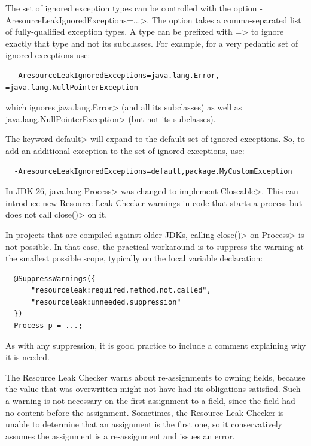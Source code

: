 The set of ignored exception types can be controlled with the option
\<-AresourceLeakIgnoredExceptions=...>.  The option takes a comma-separated list of
fully-qualified exception types.  A type can be prefixed with \<=> to ignore exactly
that type and not its subclasses.  For example, for a very pedantic set of ignored
exceptions use:

\begin{verbatim}
  -AresourceLeakIgnoredExceptions=java.lang.Error, =java.lang.NullPointerException
\end{verbatim}

which ignores \<java.lang.Error> (and all its subclasses) as well as
\<java.lang.NullPointerException> (but not its subclasses).

The keyword \<default> will expand to the default set of ignored exceptions.  So,
to add an additional exception to the set of ignored exceptions, use:

\begin{verbatim}
  -AresourceLeakIgnoredExceptions=default,package.MyCustomException
\end{verbatim}


In JDK 26, \<java.lang.Process> was changed to implement \<Closeable>.  This can
introduce new Resource Leak Checker warnings in code that starts a process but does
not call \<close()> on it.

In projects that are compiled against older JDKs, calling \<close()> on
\<Process> is not possible.  In that case, the practical
workaround is to suppress the warning at the smallest possible scope, typically on
the local variable declaration:

\begin{verbatim}
  @SuppressWarnings({
      "resourceleak:required.method.not.called",
      "resourceleak:unneeded.suppression"
  })
  Process p = ...;
\end{verbatim}

As with any suppression, it is good practice to include a comment explaining why it is needed.



The Resource Leak Checker warns about re-assignments to owning fields,
because the value that was overwritten might not have had its obligations
satisfied.  Such a warning is not necessary on the first assignment to a
field, since the field had no content before the assignment.  Sometimes,
the Resource Leak Checker is unable to determine that an assignment is the
first one, so it conservatively assumes the assignment is a re-assignment
and issues an error.

